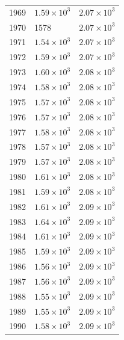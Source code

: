 \begin{table}[H]
\begin{tabular}{lll}
1969 & $\displaystyle 1.59 \times 10^{3}$ & $\displaystyle 2.07 \times 10^{3}$ \\
1970 & 1578 & $\displaystyle 2.07 \times 10^{3}$ \\
1971 & $\displaystyle 1.54 \times 10^{3}$ & $\displaystyle 2.07 \times 10^{3}$ \\
1972 & $\displaystyle 1.59 \times 10^{3}$ & $\displaystyle 2.07 \times 10^{3}$ \\
1973 & $\displaystyle 1.60 \times 10^{3}$ & $\displaystyle 2.08 \times 10^{3}$ \\
1974 & $\displaystyle 1.58 \times 10^{3}$ & $\displaystyle 2.08 \times 10^{3}$ \\
1975 & $\displaystyle 1.57 \times 10^{3}$ & $\displaystyle 2.08 \times 10^{3}$ \\
1976 & $\displaystyle 1.57 \times 10^{3}$ & $\displaystyle 2.08 \times 10^{3}$ \\
1977 & $\displaystyle 1.58 \times 10^{3}$ & $\displaystyle 2.08 \times 10^{3}$ \\
1978 & $\displaystyle 1.57 \times 10^{3}$ & $\displaystyle 2.08 \times 10^{3}$ \\
1979 & $\displaystyle 1.57 \times 10^{3}$ & $\displaystyle 2.08 \times 10^{3}$ \\
1980 & $\displaystyle 1.61 \times 10^{3}$ & $\displaystyle 2.08 \times 10^{3}$ \\
1981 & $\displaystyle 1.59 \times 10^{3}$ & $\displaystyle 2.08 \times 10^{3}$ \\
1982 & $\displaystyle 1.61 \times 10^{3}$ & $\displaystyle 2.09 \times 10^{3}$ \\
1983 & $\displaystyle 1.64 \times 10^{3}$ & $\displaystyle 2.09 \times 10^{3}$ \\
1984 & $\displaystyle 1.61 \times 10^{3}$ & $\displaystyle 2.09 \times 10^{3}$ \\
1985 & $\displaystyle 1.59 \times 10^{3}$ & $\displaystyle 2.09 \times 10^{3}$ \\
1986 & $\displaystyle 1.56 \times 10^{3}$ & $\displaystyle 2.09 \times 10^{3}$ \\
1987 & $\displaystyle 1.56 \times 10^{3}$ & $\displaystyle 2.09 \times 10^{3}$ \\
1988 & $\displaystyle 1.55 \times 10^{3}$ & $\displaystyle 2.09 \times 10^{3}$ \\
1989 & $\displaystyle 1.55 \times 10^{3}$ & $\displaystyle 2.09 \times 10^{3}$ \\
1990 & $\displaystyle 1.58 \times 10^{3}$ & $\displaystyle 2.09 \times 10^{3}$ \\

\end{tabular}
\end{table}
